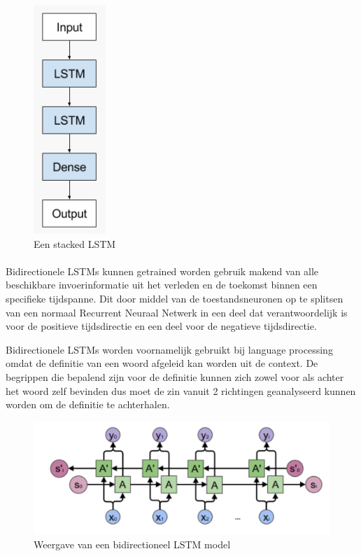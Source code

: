 \begin{figure}
    \centering
    \caption{Een stacked LSTM~\autocite{Brownlee2017b}}
    \label{fig:stacked_lstm}
    \includegraphics[width=0.15\linewidth]{stacked_lstm}
\end{figure}

\paragraph{}

Bidirectionele LSTMs kunnen getrained worden gebruik makend van alle beschikbare invoerinformatie uit het verleden en de toekomst binnen een specifieke tijdspanne. Dit door middel van de toestandsneuronen op te splitsen van een normaal Recurrent Neuraal Netwerk in een deel dat verantwoordelijk is voor de positieve tijdsdirectie en een deel voor de negatieve tijdsdirectie. ~\autocite{Brownlee2017a}

Bidirectionele LSTMs worden voornamelijk gebruikt bij language processing omdat de definitie van een woord afgeleid kan worden uit de context. De begrippen die bepalend zijn voor de definitie kunnen zich zowel voor als achter het woord zelf bevinden dus moet de zin vanuit 2 richtingen geanalyseerd kunnen worden om de definitie te achterhalen.

\begin{figure}
    \centering
    \caption{Weergave van een bidirectioneel LSTM model~\autocite{Colah2015}}
    \label{fig:bidirectional_lstm}
    \includegraphics[width=0.7\linewidth]{bidirectional_lstm}
\end{figure}

